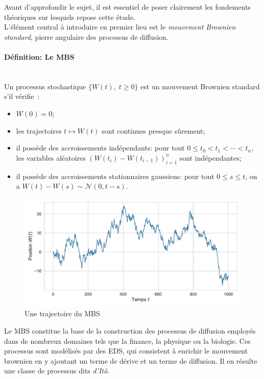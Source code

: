 Avant d'approfondir le sujet, il est essentiel de poser clairement les fondements théoriques sur lesquels repose cette étude.\\
L'élément central à introduire en premier lieu est le \textit{mouvement Brownien standard}, pierre angulaire des processus de diffusion.
\paragraph{Définition: Le \acl{MBS}}\mbox{}\\ 
Un processus stochastique $\{W(t),\;t\geq0\}$ est un mouvement Brownien standard s'il vérifie~\cite{lefebvre2007}:
\begin{itemize}
    \item $W(0) = 0$;
    \item les trajectoires $t \mapsto W(t)$ sont continues presque sûrement;
    \item il possède des accroissements indépendants: pour tout $0 \leq t_0 < t_1 < \cdots < t_n$, les variables aléatoires ${\left(W(t_i) - W(t_{i-1})\right)}_{i=1}^n$ sont indépendantes;
    \item il possède des accroissements stationnaires gaussiens: pour tout $0 \leq s \leq t$, on a $W(t) - W(s) \sim \mathcal{N}(0, t - s)$.
\end{itemize}
\begin{figure}[htb]
    \centering
    \includegraphics[width=0.9\linewidth]{img/intro/path_MBS.pdf}
    \caption{Une trajectoire du \acl{MBS}}\label{fig:TrajMBS}
\end{figure}
\FloatBarrier Le \acs{MBS} constitue la base de la construction des processus de diffusion employés dans de nombreux domaines tels que la finance, la physique ou la biologie. Ces processus sont modélisés par des \acf{EDS}, qui consistent à enrichir le mouvement brownien en y ajoutant un terme de dérive et un terme de diffusion. Il en résulte une classe de processus dits \textit{d'Itô}.
